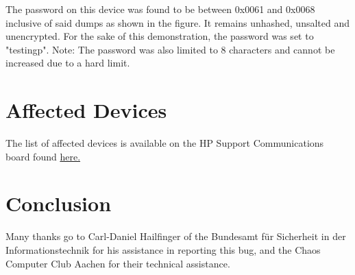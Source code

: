 \documentclass[a4paper,12pt]{article}
\begin{document}
The password on this device was found to be between 0x0061 and 0x0068 inclusive of said dumps as shown in the figure. It remains unhashed, unsalted and unencrypted. For the sake of this demonstration, the password was set to "testingp". Note: The password was also limited to 8 characters and cannot be increased due to a hard limit.


\section{Affected Devices}
The list of affected devices is available on the HP Support Communications board found \href{https://support.hp.com/us-en/document/c05913581}{here.}



\section{Conclusion}

Many thanks go to Carl-Daniel Hailfinger of the Bundesamt f{\"u}r Sicherheit in der Informationstechnik for his assistance in reporting this bug, and the Chaos Computer Club Aachen for their technical assistance.
\end{document}
